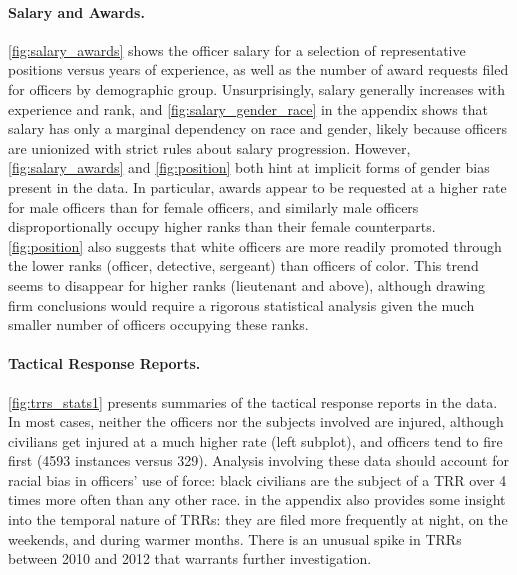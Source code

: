 \paragraph{Salary and Awards.}
\cref{fig:salary_awards} shows the officer salary for a selection of
representative positions versus years of experience, as well as the number of
award requests filed for officers by demographic group.  Unsurprisingly, salary
generally increases with experience and rank, and \cref{fig:salary_gender_race}
in the appendix shows that salary has only a marginal dependency on race and
gender, likely because officers are unionized with strict rules about salary
progression. However, \cref{fig:salary_awards} and \cref{fig:position} both
hint at implicit forms of gender bias present in the data. In particular,
awards appear to be requested at a higher rate for male officers than for
female officers, and similarly male officers disproportionally occupy higher
ranks than their female counterparts. \cref{fig:position} also suggests that
white officers are more readily promoted through the lower ranks (officer,
detective, sergeant) than officers of color.  This trend seems to disappear for
higher ranks (lieutenant and above), although drawing firm conclusions would
require a rigorous statistical analysis given the much smaller number of
officers occupying these ranks.

\paragraph{Tactical Response Reports.}
\cref{fig:trrs_stats1} presents summaries of the tactical response reports in
the data.  In most cases, neither the officers nor the subjects involved are
injured, although civilians get injured at a much higher rate (left subplot),
and officers tend to fire first (4593 instances versus 329).  Analysis
involving these data should account for racial bias in officers' use of force:
black civilians are the subject of a TRR over 4 times more often than any other
race.  in the appendix also provides some insight into the
temporal nature of TRRs: they are filed more frequently at night, on the
weekends, and during warmer months. There is an unusual spike in TRRs between
2010 and 2012 that warrants further investigation.





